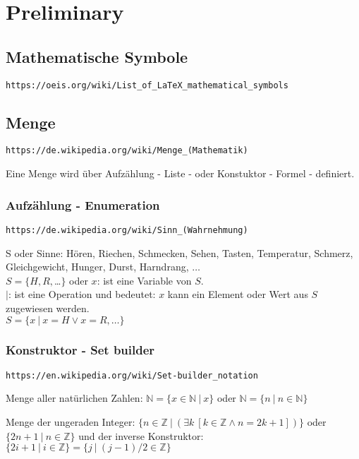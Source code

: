 \documentclass[10pt,a4paper]{article}
\begin{document}
\section {Preliminary}

\newcommand{\N}{\mathbb{N}} %
\newcommand{\Z}{\mathbb{Z}} %

\subsection {Mathematische Symbole}

\verb+https://oeis.org/wiki/List_of_LaTeX_mathematical_symbols+

\subsection {Menge}

\verb+https://de.wikipedia.org/wiki/Menge_(Mathematik)+
\vskip 8pt

Eine Menge wird über Aufzählung - Liste - oder Konstuktor - Formel - definiert.

\subsubsection {Aufzählung - Enumeration}

\verb+https://de.wikipedia.org/wiki/Sinn_(Wahrnehmung)+
\vskip 8pt

S oder Sinne: Hören, Riechen, Schmecken, Sehen, Tasten, Temperatur, Schmerz,
Gleichgewicht, Hunger, Durst, Harndrang, $\ldots$ \\
$S = \{ H, R, $\ldots$ \}$
\vskip 8pt
oder
\vskip 8pt
$x$: ist eine Variable von $S$. \\
$|$: ist eine Operation und bedeutet: $x$ kann ein Element oder Wert aus $S$
zugewiesen werden. \\
$S = \{ x\ |\ x = H \lor x = R, \ldots \}$

\subsubsection {Konstruktor - Set builder}

\verb+https://en.wikipedia.org/wiki/Set-builder_notation+
\vskip 8pt

Menge aller natürlichen Zahlen: $\N = \{x \in \N\ |\ x \}$
\vskip 8pt
oder
\vskip 8pt
$\N = \{n\ |\ n \in \N\}$

\vskip 8pt
Menge der ungeraden Integer: $\{n \in \Z\ |\ (\exists k\ [k \in \Z \land n = 2k + 1])\}$
\vskip 8pt
oder
\vskip 8pt
$\{2n + 1\ |\ n \in \Z\}$
\vskip 8pt
und der inverse Konstruktor:
$\{ 2i + 1\ |\ i \in \Z \} = \{ j\ |\ (j - 1) / 2 \in \Z \}$
\end{document}
